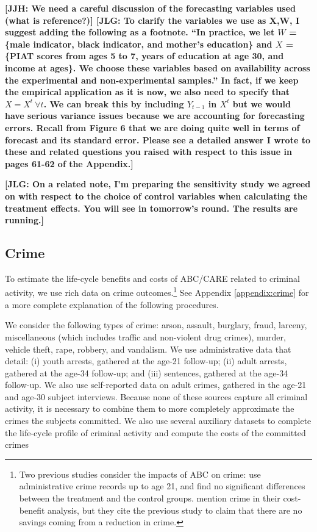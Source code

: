 \textbf{[JJH: We need a careful discussion of the forecasting variables used (what is reference?)] [JLG: To clarify the variables we use as X,W, I suggest adding the following as a footnote. ``In practice, we let $W$ = \{male indicator, black indicator, and mother's education\} and $X$ = \{PIAT scores from ages 5 to 7, years of education at age 30, and income at ages\}. We choose these variables based on availability across the experimental and non-experimental samples.'' In fact, if we keep the empirical application as it is now, we also need to specify that $X = X^t \ \forall t$. We can break this by including $Y_{t - 1}$ in $X^t$ but we would have serious variance issues because we are accounting for forecasting errors. Recall from Figure 6 that we are doing quite well in terms of forecast and its standard error. Please see a detailed answer I wrote to these and related questions you raised with respect to this issue in pages 61-62 of the Appendix.]}

\textbf{[JLG: On a related note, I'm preparing the sensitivity study we agreed on with respect to the choice of control variables when calculating the treatment effects. You will see in tomorrow's round. The results are running.]}

\subsection{Crime}  \label{sec:crime}

To estimate the life-cycle benefits and costs of ABC/CARE related to criminal activity, we use rich data on crime outcomes.\footnote{Two previous studies consider the impacts of ABC on crime: \citet{Clarke_Campbell_1998_ABC_Comparison_ECRQ} use administrative crime records up to age 21, and find no significant differences between the treatment and the control groups. \cite{Barnett_Masse_2007_EER} mention crime in their cost-benefit analysis, but they cite the previous study to claim that there are no savings coming from a reduction in crime.} See Appendix \ref{appendix:crime} for a more complete explanation of the following procedures.

We consider the following types of crime: arson, assault, burglary, fraud, larceny, miscellaneous (which includes traffic and non-violent drug crimes), murder, vehicle theft, rape, robbery, and vandalism. We use administrative data that detail: (i) youth arrests, gathered at the age-21 follow-up; (ii) adult arrests, gathered at the age-34 follow-up; and (iii) sentences, gathered at the age-34 follow-up. We also use self-reported data on adult crimes, gathered in the age-21 and age-30 subject interviews. Because none of these sources capture all criminal activity, it is necessary to combine them to more completely approximate the crimes the subjects committed. We also use several auxiliary datasets to complete the life-cycle profile of criminal activity and compute the costs of the committed crimes

